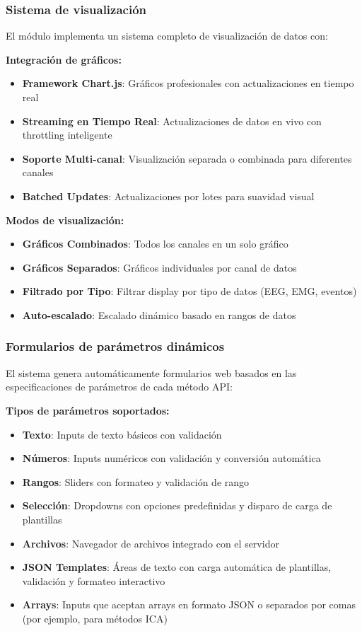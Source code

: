 \subsubsection{Sistema de visualización}

El módulo implementa un sistema completo de visualización de datos con:

\textbf{Integración de gráficos:}
\begin{itemize}
    \item \textbf{Framework Chart.js}: Gráficos profesionales con actualizaciones en tiempo real
    \item \textbf{Streaming en Tiempo Real}: Actualizaciones de datos en vivo con throttling inteligente
    \item \textbf{Soporte Multi-canal}: Visualización separada o combinada para diferentes canales
    \item \textbf{Batched Updates}: Actualizaciones por lotes para suavidad visual
\end{itemize}

\textbf{Modos de visualización:}
\begin{itemize}
    \item \textbf{Gráficos Combinados}: Todos los canales en un solo gráfico
    \item \textbf{Gráficos Separados}: Gráficos individuales por canal de datos
    \item \textbf{Filtrado por Tipo}: Filtrar display por tipo de datos (EEG, EMG, eventos)
    \item \textbf{Auto-escalado}: Escalado dinámico basado en rangos de datos
\end{itemize}

\subsubsection{Formularios de parámetros dinámicos}

El sistema genera automáticamente formularios web basados en las especificaciones de parámetros de cada método API:

\textbf{Tipos de parámetros soportados:}
\begin{itemize}
    \item \textbf{Texto}: Inputs de texto básicos con validación
    \item \textbf{Números}: Inputs numéricos con validación y conversión automática
    \item \textbf{Rangos}: Sliders con formateo y validación de rango
    \item \textbf{Selección}: Dropdowns con opciones predefinidas y disparo de carga de plantillas
    \item \textbf{Archivos}: Navegador de archivos integrado con el servidor
    \item \textbf{JSON Templates}: Áreas de texto con carga automática de plantillas, validación y formateo interactivo
    \item \textbf{Arrays}: Inputs que aceptan arrays en formato JSON o separados por comas (por ejemplo, para métodos ICA)
\end{itemize}

